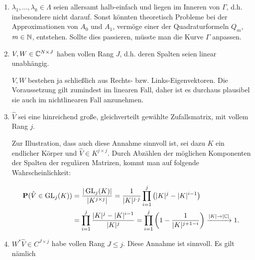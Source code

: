 \begin{enumerate}[label = \arabic*.]

    \item $\lambda_1, \dots, \lambda_k \in \Lambda$ seien allersamt halb-einfach und liegen im Inneren von $\Gamma$, d.h. insbesondere nicht darauf.
    Sonst könnten theoretisch Probleme bei der Approximationen von $A_0$ und $A_1$, vermöge einer der Quadraturformeln $Q_m$, $m \in \mathbb{N}$, entstehen.
    Sollte dies passieren, müsste man die Kurve $\Gamma$ anpassen.

    \item $V, W \in \mathbb{C}^{N \times J}$ haben vollen Rang $J$, d.h. deren Spalten seien linear unabhängig.

    $V, W$ bestehen ja schließlich aus Rechts- bzw. Links-Eigenvektoren.
    Die Voraussetzung gilt zumindest im linearen Fall, daher ist es durchaus
    plausibel sie auch im nichtlinearen Fall anzunehmen.

    \item $\hat V$ sei eine hinreichend große, gleichverteilt gewählte Zufallsmatrix, mit vollem Rang $j$.

    Zur Illustration, dass auch diese Annahme sinnvoll ist, sei dazu $K$ ein endlicher Körper und $\hat V \in K^{j \times j}$.
    Durch Abzählen der möglichen Komponenten der Spalten der regulären Matrizen, kommt man auf folgende Wahrscheinlichkeit:

    \begin{align*}
        \mathbf{P}(\hat V \in \operatorname{GL}_j(K))
        &=
        \frac
        {
            |\operatorname{GL}_j(K)|
        }{
            |K^{j \times j}|
        }
        =
        \frac{1}
        {
            |K|^{j \cdot j}
        }
        \prod_{i=1}^j
            {\left ( 
                |K|^j - |K|^{i-1}
             \right )} \\
        &=
        \prod_{i=1}^j
            \frac
            {
                |K|^j - |K|^{i-1}
            }{
                |K|^j
            }
        =
        \prod_{i=1}^j
            {\left ( 
                1 - \frac{1}{|K|^{j + 1 - i}}
             \right )}
        \xrightarrow{|K| \to |\mathbb{C}|}
        1.
    \end{align*}

    \item $W^\ast \hat V \in C^{J \times j}$ habe vollen Rang $J \leq j$.
    Diese Annahme ist sinnvoll.
    Es gilt nämlich


\end{enumerate}
